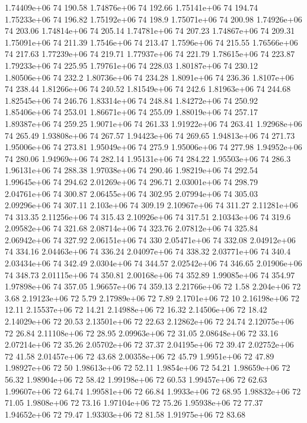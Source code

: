 1.74409e+06 74 190.58
1.74876e+06 74 192.66
1.75141e+06 74 194.74
1.75233e+06 74 196.82
1.75192e+06 74 198.9
1.75071e+06 74 200.98
1.74926e+06 74 203.06
1.74814e+06 74 205.14
1.74781e+06 74 207.23
1.74867e+06 74 209.31
1.75091e+06 74 211.39
1.7546e+06 74 213.47
1.7596e+06 74 215.55
1.76566e+06 74 217.63
1.77239e+06 74 219.71
1.77937e+06 74 221.79
1.78615e+06 74 223.87
1.79233e+06 74 225.95
1.79761e+06 74 228.03
1.80187e+06 74 230.12
1.80506e+06 74 232.2
1.80736e+06 74 234.28
1.8091e+06 74 236.36
1.8107e+06 74 238.44
1.81266e+06 74 240.52
1.81549e+06 74 242.6
1.81963e+06 74 244.68
1.82545e+06 74 246.76
1.83314e+06 74 248.84
1.84272e+06 74 250.92
1.85406e+06 74 253.01
1.86671e+06 74 255.09
1.88019e+06 74 257.17
1.89387e+06 74 259.25
1.9071e+06 74 261.33
1.91922e+06 74 263.41
1.92968e+06 74 265.49
1.93808e+06 74 267.57
1.94423e+06 74 269.65
1.94813e+06 74 271.73
1.95006e+06 74 273.81
1.95049e+06 74 275.9
1.95006e+06 74 277.98
1.94952e+06 74 280.06
1.94969e+06 74 282.14
1.95131e+06 74 284.22
1.95503e+06 74 286.3
1.96131e+06 74 288.38
1.97038e+06 74 290.46
1.98219e+06 74 292.54
1.99645e+06 74 294.62
2.01269e+06 74 296.71
2.03001e+06 74 298.79
2.04761e+06 74 300.87
2.06455e+06 74 302.95
2.07994e+06 74 305.03
2.09296e+06 74 307.11
2.103e+06 74 309.19
2.10967e+06 74 311.27
2.11281e+06 74 313.35
2.11256e+06 74 315.43
2.10926e+06 74 317.51
2.10343e+06 74 319.6
2.09582e+06 74 321.68
2.08714e+06 74 323.76
2.07812e+06 74 325.84
2.06942e+06 74 327.92
2.06151e+06 74 330
2.05471e+06 74 332.08
2.04912e+06 74 334.16
2.04463e+06 74 336.24
2.04097e+06 74 338.32
2.03771e+06 74 340.4
2.03434e+06 74 342.49
2.0304e+06 74 344.57
2.02542e+06 74 346.65
2.01906e+06 74 348.73
2.01115e+06 74 350.81
2.00168e+06 74 352.89
1.99085e+06 74 354.97
1.97898e+06 74 357.05
1.96657e+06 74 359.13
2.21766e+06 72 1.58
2.204e+06 72 3.68
2.19123e+06 72 5.79
2.17989e+06 72 7.89
2.1701e+06 72 10
2.16198e+06 72 12.11
2.15537e+06 72 14.21
2.14988e+06 72 16.32
2.14506e+06 72 18.42
2.14029e+06 72 20.53
2.13501e+06 72 22.63
2.12862e+06 72 24.74
2.12075e+06 72 26.84
2.11108e+06 72 28.95
2.09963e+06 72 31.05
2.08648e+06 72 33.16
2.07214e+06 72 35.26
2.05702e+06 72 37.37
2.04195e+06 72 39.47
2.02752e+06 72 41.58
2.01457e+06 72 43.68
2.00358e+06 72 45.79
1.9951e+06 72 47.89
1.98927e+06 72 50
1.98613e+06 72 52.11
1.9854e+06 72 54.21
1.98659e+06 72 56.32
1.98904e+06 72 58.42
1.99198e+06 72 60.53
1.99457e+06 72 62.63
1.99607e+06 72 64.74
1.99581e+06 72 66.84
1.9933e+06 72 68.95
1.98832e+06 72 71.05
1.9808e+06 72 73.16
1.97104e+06 72 75.26
1.95938e+06 72 77.37
1.94652e+06 72 79.47
1.93303e+06 72 81.58
1.91975e+06 72 83.68
